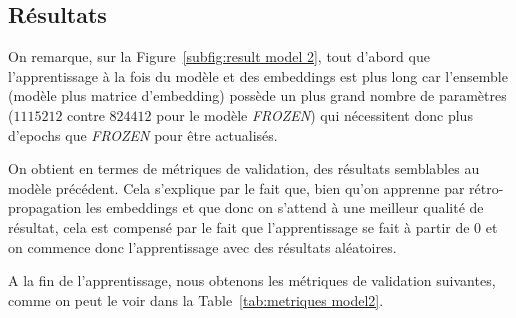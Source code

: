 \documentclass[a4paper]{article}
\begin{document}
\subsection{Résultats}


On remarque, sur la Figure~\ref{subfig:result model 2}, tout d'abord que l'apprentissage à la fois du modèle et des embeddings est plus 
long car l'ensemble (modèle plus matrice d'embedding) possède un plus grand nombre de paramètres ($1115212$ contre $824412$ pour le 
modèle \textit{FROZEN}) qui nécessitent donc plus d'epochs que \textit{FROZEN} pour être actualisés.

On obtient en termes de métriques de validation, des résultats semblables au modèle précédent. Cela s'explique par le fait que, bien 
qu'on apprenne par rétro-propagation les embeddings et que donc on s'attend à une meilleur qualité de résultat, cela est compensé par 
le fait que l'apprentissage se fait à partir de 0 et on commence donc l'apprentissage avec des résultats aléatoires.

A la fin de l'apprentissage, nous obtenons les métriques de validation suivantes, comme on peut le voir dans la 
Table~\ref{tab:metriques model2}.
\end{document}
